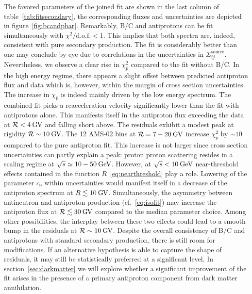 \documentclass[a4paper,11pt]{article}
\newcommand{\eVdist}{\kern-0.06em}
\newcommand{\gev}{\:\text{Ge\eVdist V}}
\newcommand{\gv}{\:\text{G\eVdist V}}
\newcommand{\R}{\mathcal{R}}
\begin{document}
The favored parameters of the joined fit are shown in the last column of table~\ref{tab:fitsecondary}, the corresponding fluxes and uncertainties are depicted in figure~\ref{fig:bcandpbar}. Remarkably, B/C and antiprotons can be fit simultaneously with $\chi^2/\text{d.o.f.}<1$. This implies that both spectra are, indeed, consistent with pure secondary production. The fit is considerably better than one may conclude by eye due to correlations in the uncertainties in $\Sigma_{ij}^\text{source}$. Nevertheless, we observe a clear rise in $\chi_{\bar{p}}^2$ compared to the fit without B/C. In the high energy regime, there appears a slight offset between predicted antiproton flux and data which is, however, within the margin of cross section uncertainties. The increase in $\chi_{\bar{p}}$ is indeed mainly driven by the low energy spectrum. The combined fit picks a reacceleration velocity significantly lower than the fit with antiprotons alone. This manifests itself in the antiproton flux exceeding the data at $\R < 4 \gv$ and falling short above. The residuals exhibit a modest peak at rigidity $\R\sim 10 \gv$. The 12 AMS-02 bins at $\R=7-20\gv$ increase $\chi^2_{\bar{p}}$ by $\sim 10$ compared to the pure antiproton fit. This increase is not larger since cross section uncertainties can partly explain a peak: proton proton scattering resides in a scaling regime at $\sqrt{s}\simeq 10 - 50\gev$. However, at $\sqrt{s}< 10\gev$ near-threshold effects contained in the function $R$~\eqref{eq:nearthreshold} play a role. Lowering of the parameter $c_9$ within uncertainties would manifest itself in a decrease of the antiproton spectrum at $R\lesssim 10\gv$. Simultaneously, the asymmetry between antineutron and antiproton production (cf.~\eqref{eq:isofit}) may increase the antiproton flux at $\R\lesssim 30\gv$ compared to the median parameter choice. Among other possibilities, the interplay between these two effects could lead to a smooth bump in the residuals at $\R\sim 10\gv$. Despite the overall consistency of B/C and antiprotons with standard secondary production, there is still room for modifications. If an alternative hypothesis is able to capture the shape of residuals, it may still be statistically preferred at a significant level. In section~\ref{sec:darkmatter} we will explore whether a significant improvement of the fit arises in the presence of a primary antiproton component from dark matter annihilation.
\end{document}
